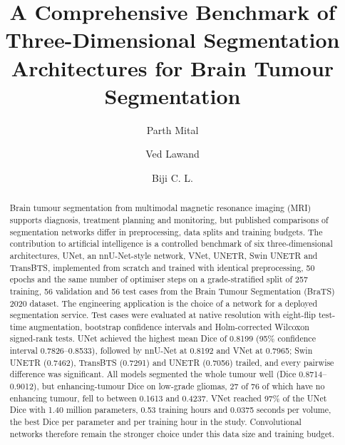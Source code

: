 \documentclass[a4paper,fleqn]{cas-sc}
\begin{document}
\let\WriteBookmarks\relax


\title[mode=title]{A Comprehensive Benchmark of Three-Dimensional Segmentation Architectures for Brain Tumour Segmentation}

\author[1]{Parth Mital}
\cormark[1]
\author[1]{Ved Lawand}
\author[1]{Biji C. L.}



\begin{abstract}
Brain tumour segmentation from multimodal magnetic resonance imaging (MRI) supports diagnosis, treatment planning and monitoring, but published comparisons of segmentation networks differ in preprocessing, data splits and training budgets. The contribution to artificial intelligence is a controlled benchmark of six three-dimensional architectures, UNet, an nnU-Net-style network, VNet, UNETR, Swin UNETR and TransBTS, implemented from scratch and trained with identical preprocessing, 50 epochs and the same number of optimiser steps on a grade-stratified split of 257 training, 56 validation and 56 test cases from the Brain Tumour Segmentation (BraTS) 2020 dataset. The engineering application is the choice of a network for a deployed segmentation service. Test cases were evaluated at native resolution with eight-flip test-time augmentation, bootstrap confidence intervals and Holm-corrected Wilcoxon signed-rank tests. UNet achieved the highest mean Dice of 0.8199 (95\% confidence interval 0.7826--0.8533), followed by nnU-Net at 0.8192 and VNet at 0.7965; Swin UNETR (0.7462), TransBTS (0.7291) and UNETR (0.7056) trailed, and every pairwise difference was significant. All models segmented the whole tumour well (Dice 0.8714--0.9012), but enhancing-tumour Dice on low-grade gliomas, 27 of 76 of which have no enhancing tumour, fell to between 0.1613 and 0.4237. VNet reached 97\% of the UNet Dice with 1.40 million parameters, 0.53 training hours and 0.0375 seconds per volume, the best Dice per parameter and per training hour in the study. Convolutional networks therefore remain the stronger choice under this data size and training budget.
\end{abstract}
\end{document}
